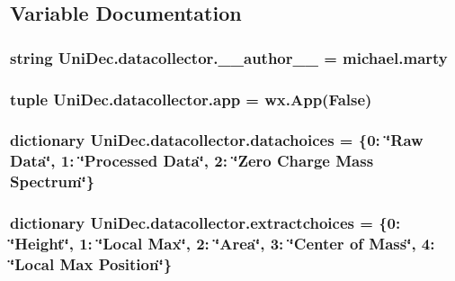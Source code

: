 \subsection{Variable Documentation}
\hypertarget{namespace_uni_dec_1_1datacollector_aef7e269d4e2152f26232e3bd224edf44}{}
\subsubsection[{\+\_\+\+\_\+author\+\_\+\+\_\+}]{\setlength{\rightskip}{0pt plus 5cm}string Uni\+Dec.\+datacollector.\+\_\+\+\_\+author\+\_\+\+\_\+ = \textquotesingle{}michael.\+marty\textquotesingle{}}\label{namespace_uni_dec_1_1datacollector_aef7e269d4e2152f26232e3bd224edf44}
\hypertarget{namespace_uni_dec_1_1datacollector_acea9d885cce1d9b9d2c89e6649a1d381}{}
\subsubsection[{app}]{\setlength{\rightskip}{0pt plus 5cm}tuple Uni\+Dec.\+datacollector.\+app = wx.\+App(False)}\label{namespace_uni_dec_1_1datacollector_acea9d885cce1d9b9d2c89e6649a1d381}
\hypertarget{namespace_uni_dec_1_1datacollector_a60c587f046c04675d27a6e2401fabe41}{}
\subsubsection[{datachoices}]{\setlength{\rightskip}{0pt plus 5cm}dictionary Uni\+Dec.\+datacollector.\+datachoices = \{0\+: \char`\"{}Raw Data\char`\"{}, 1\+: \char`\"{}Processed Data\char`\"{}, 2\+: \char`\"{}Zero Charge Mass Spectrum\char`\"{}\}}\label{namespace_uni_dec_1_1datacollector_a60c587f046c04675d27a6e2401fabe41}
\hypertarget{namespace_uni_dec_1_1datacollector_a87b13d28a08d0bf8f12aa57b70d76d1b}{}
\subsubsection[{extractchoices}]{\setlength{\rightskip}{0pt plus 5cm}dictionary Uni\+Dec.\+datacollector.\+extractchoices = \{0\+: \char`\"{}Height\char`\"{}, 1\+: \char`\"{}Local Max\char`\"{}, 2\+: \char`\"{}Area\char`\"{}, 3\+: \char`\"{}Center of Mass\char`\"{}, 4\+: \char`\"{}Local Max Position\char`\"{}\}}\label{namespace_uni_dec_1_1datacollector_a87b13d28a08d0bf8f12aa57b70d76d1b}
\hypertarget{namespace_uni_dec_1_1datacollector_aec857f9315b3a9f7c5e344eb0fbdbf16}{}

